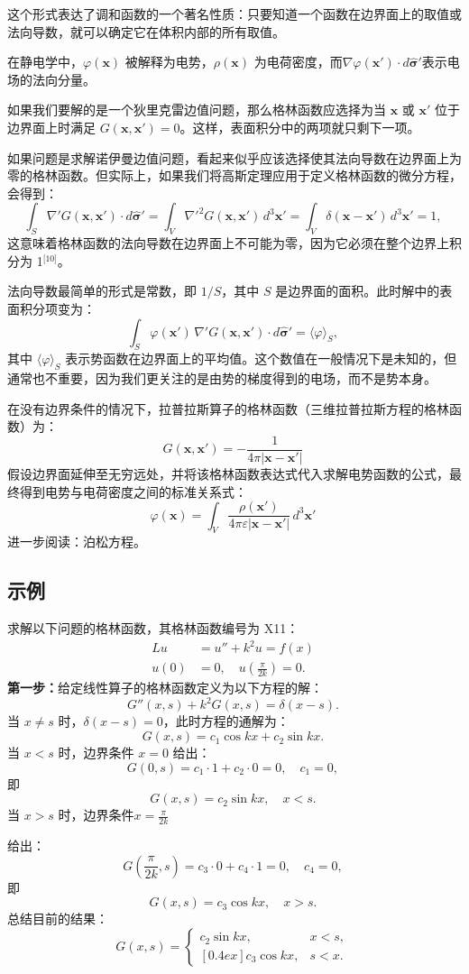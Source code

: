 这个形式表达了调和函数的一个著名性质：只要知道一个函数在边界面上的取值或法向导数，就可以确定它在体积内部的所有取值。

在静电学中，$\varphi(\mathbf{x})$ 被解释为电势，$\rho(\mathbf{x})$ 为电荷密度，而$\nabla \varphi(\mathbf{x}') \cdot d\hat{\boldsymbol{\sigma}}'$表示电场的法向分量。

如果我们要解的是一个狄里克雷边值问题，那么格林函数应选择为当 $\mathbf{x}$ 或 $\mathbf{x}'$ 位于边界面上时满足 $G(\mathbf{x}, \mathbf{x}') = 0$。这样，表面积分中的两项就只剩下一项。

如果问题是求解诺伊曼边值问题，看起来似乎应该选择使其法向导数在边界面上为零的格林函数。但实际上，如果我们将高斯定理应用于定义格林函数的微分方程，会得到：
$$
\int_S \nabla' G(\mathbf{x}, \mathbf{x}') \cdot d\hat{\boldsymbol{\sigma}}' = \int_V \nabla'^2 G(\mathbf{x}, \mathbf{x}')\,d^3\mathbf{x}' = \int_V \delta(\mathbf{x} - \mathbf{x}')\,d^3\mathbf{x}' = 1,~
$$
这意味着格林函数的法向导数在边界面上不可能为零，因为它必须在整个边界上积分为 1\(^\text{[10]}\)。

法向导数最简单的形式是常数，即 $1/S$，其中 $S$ 是边界面的面积。此时解中的表面积分项变为：
$$
\int_S \varphi(\mathbf{x}')\,\nabla' G(\mathbf{x}, \mathbf{x}') \cdot d\hat{\boldsymbol{\sigma}}' = \langle \varphi \rangle_S,~
$$
其中 $\langle \varphi \rangle_S$ 表示势函数在边界面上的平均值。这个数值在一般情况下是未知的，但通常也不重要，因为我们更关注的是由势的梯度得到的电场，而不是势本身。

在没有边界条件的情况下，拉普拉斯算子的格林函数（三维拉普拉斯方程的格林函数）为：
$$
G(\mathbf{x}, \mathbf{x}') = -\frac{1}{4\pi |\mathbf{x} - \mathbf{x}'|}~
$$
假设边界面延伸至无穷远处，并将该格林函数表达式代入求解电势函数的公式，最终得到电势与电荷密度之间的标准关系式：
$$
\varphi(\mathbf{x}) = \int_V \frac{\rho(\mathbf{x}')}{4\pi \varepsilon |\mathbf{x} - \mathbf{x}'|} \, d^3\mathbf{x}'~
$$
进一步阅读：泊松方程。
\subsection{示例}
求解以下问题的格林函数，其格林函数编号为 X11：
$$
\begin{aligned}
Lu &= u'' + k^2 u = f(x) \\
u(0) &= 0, \quad u\left(\frac{\pi}{2k}\right) = 0.
\end{aligned}~
$$
\textbf{第一步：}给定线性算子的格林函数定义为以下方程的解：
$$
G''(x,s) + k^2 G(x,s) = \delta(x-s). \tag{Eq.*}~
$$
当 $x \neq s$ 时，$\delta(x-s) = 0$，此时方程的通解为：
$$
G(x,s) = c_1 \cos kx + c_2 \sin kx.~
$$
当 $x < s$ 时，边界条件 $x = 0$ 给出：
$$
G(0,s) = c_1 \cdot 1 + c_2 \cdot 0 = 0,
\quad c_1 = 0,~
$$
即
$$
G(x,s) = c_2 \sin kx, \quad x < s.~
$$
当 $x > s$ 时，边界条件$x = \frac{\pi}{2k}$

给出：
$$
G\left(\frac{\pi}{2k},s\right) = c_3 \cdot 0 + c_4 \cdot 1 = 0,
\quad c_4 = 0,~
$$
即
$$
G(x,s) = c_3 \cos kx, \quad x > s.~
$$
总结目前的结果：
$$
G(x,s) = 
\begin{cases}
c_2 \sin kx, & x < s, \\
[0.4ex]
c_3 \cos kx, & s < x.
\end{cases}~
$$
